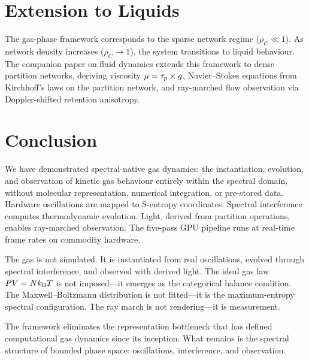 \section{Extension to Liquids}
\label{sec:extension}

The gas-phase framework corresponds to the sparse network regime ($\rho_C \ll 1$). As network density increases ($\rho_C \to 1$), the system transitions to liquid behaviour. The companion paper on fluid dynamics extends this framework to dense partition networks, deriving viscosity $\mu = \tau_p \times g$, Navier--Stokes equations from Kirchhoff's laws on the partition network, and ray-marched flow observation via Doppler-shifted retention anisotropy.

\section{Conclusion}
\label{sec:conclusion}

We have demonstrated spectral-native gas dynamics: the instantiation, evolution, and observation of kinetic gas behaviour entirely within the spectral domain, without molecular representation, numerical integration, or pre-stored data. Hardware oscillations are mapped to S-entropy coordinates. Spectral interference computes thermodynamic evolution. Light, derived from partition operations, enables ray-marched observation. The five-pass GPU pipeline runs at real-time frame rates on commodity hardware.

The gas is not simulated. It is instantiated from real oscillations, evolved through spectral interference, and observed with derived light. The ideal gas law $PV = Nk_{\mathrm{B}} T$ is not imposed---it emerges as the categorical balance condition. The Maxwell--Boltzmann distribution is not fitted---it is the maximum-entropy spectral configuration. The ray march is not rendering---it is measurement.

The framework eliminates the representation bottleneck that has defined computational gas dynamics since its inception. What remains is the spectral structure of bounded phase space: oscillations, interference, and observation.



